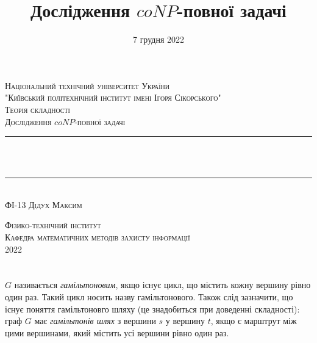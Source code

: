 \documentclass[14pt]{article}
\begin{document}
\begin{spacing}{1.175}	
	\begin{titlepage} 
		\newcommand{\HRule}{\rule{\linewidth}{0.3mm}}
		\center 
		
		\textsc{\large Національний технічний університет України
			\\"Київський політехнічний інститут імені Ігоря Сікорського"}\\[1.5cm]
		
		\vspace{5cm}
		\textsc{\large Теорія складності}\\[0.5cm]
		
		\textsc{\large Дослідження \(coNP\)-повної задачі}\\[0.5cm] 
		
		\HRule\\[0.4cm]
		
		{\huge {}}\\[0.4cm]
		
		\HRule\\[1.5cm]
		\textsc{\large ФІ-13 Дідух Максим}\\[0.5cm]
		
		\vspace{9cm}
		
		\textsc{\large Фізико-технічний інститут}\\[0.5cm]
		\textsc{\large Кафедра математичних методів захисту інформації}\\[0.5cm]
		{\large {2022}} 
	\end{titlepage}
    
    
    
    \newpage
    \title{\Large Дослідження \(coNP\)-повної задачі}
    \date{\large 7 грудня 2022}
    \maketitle
    \tableofcontents                                                                            %
    \newpage
    \section{}
         \(G\) називається \textit{гамільтоновим}, якщо існує цикл, що містить кожну вершину рівно один раз. Такий цикл носить назву гамільтонового. Також слід зазначити, що існує поняття гамільтоновго шляху (це знадобиться при доведенні складності): граф \(G\) має \textit{гамільтонів шлях} з вершини \(s\) у вершину \(t\), якщо є марштрут між цими вершинами, який містить усі вершини рівно один раз.
        

\end{spacing}
\end{document}
